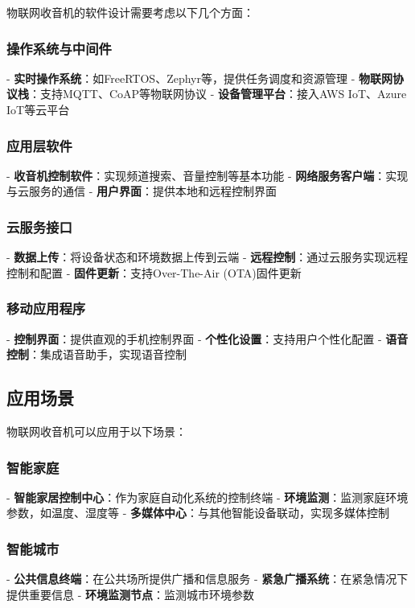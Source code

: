 \documentclass[12pt,UTF8]{ctexbook}
\begin{document}
物联网收音机的软件设计需要考虑以下几个方面：

\subsubsection{操作系统与中间件}
- \textbf{实时操作系统}：如FreeRTOS、Zephyr等，提供任务调度和资源管理
- \textbf{物联网协议栈}：支持MQTT、CoAP等物联网协议
- \textbf{设备管理平台}：接入AWS IoT、Azure IoT等云平台

\subsubsection{应用层软件}
- \textbf{收音机控制软件}：实现频道搜索、音量控制等基本功能
- \textbf{网络服务客户端}：实现与云服务的通信
- \textbf{用户界面}：提供本地和远程控制界面

\subsubsection{云服务接口}
- \textbf{数据上传}：将设备状态和环境数据上传到云端
- \textbf{远程控制}：通过云服务实现远程控制和配置
- \textbf{固件更新}：支持Over-The-Air (OTA)固件更新

\subsubsection{移动应用程序}
- \textbf{控制界面}：提供直观的手机控制界面
- \textbf{个性化设置}：支持用户个性化配置
- \textbf{语音控制}：集成语音助手，实现语音控制

\subsection{应用场景}

物联网收音机可以应用于以下场景：

\subsubsection{智能家庭}
- \textbf{智能家居控制中心}：作为家庭自动化系统的控制终端
- \textbf{环境监测}：监测家庭环境参数，如温度、湿度等
- \textbf{多媒体中心}：与其他智能设备联动，实现多媒体控制

\subsubsection{智能城市}
- \textbf{公共信息终端}：在公共场所提供广播和信息服务
- \textbf{紧急广播系统}：在紧急情况下提供重要信息
- \textbf{环境监测节点}：监测城市环境参数
\end{document}

